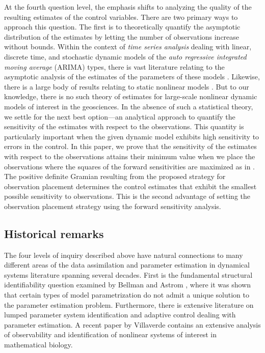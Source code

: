 \documentclass{article}
\begin{document}
At the fourth question level, the emphasis shifts to analyzing the quality of the resulting estimates of the control variables. There are two primary ways to approach this question. The first is to theoretically quantify the asymptotic distribution of the estimates by letting the number of observations increase without bounds. Within the context of \emph{time series analysis} dealing with linear, discrete time, and stochastic dynamic models of the \emph{auto regressive integrated moving average} (ARIMA) types, there is vast literature relating to the asymptotic analysis of the estimates of the parameters of these models \cite{fuller1976introduction, brockwell2006time}. Likewise, there is a large body of results relating to static nonlinear models \cite{seber1988nonlinear,gallant1987nonlinear}. But to our knowledge, there is no such theory of estimates for large-scale nonlinear dynamic models of interest in the geosciences. In the absence of such a statistical theory, we settle for the next best option---an analytical approach to quantify the sensitivity of the estimates with respect to the observations. This quantity is particularly important when the given dynamic model exhibits high sensitivity to errors in the control. In this paper, we prove that the sensitivity of the estimates with respect to the observations attains their minimum value when we place the observations where the squares of the forward sensitivities are maximized as in \cite{lakshmivarahan2020controlling,lakshmivarahan2022observability}. The positive definite Gramian resulting from the proposed strategy for observation placement determines the control estimates that exhibit the smallest possible sensitivity to observations. This is the second advantage of setting the observation placement strategy using the forward sensitivity analysis.

\subsection{Historical remarks}
The four levels of inquiry described above have natural connections to many different areas of the data assimilation and parameter estimation in dynamical systems literature spanning several decades. First is the fundamental structural identifiability question examined by Bellman and Astrom \cite{bellman1970structural}, where it was shown that certain types of model parametrization do not admit a unique solution to the parameter estimation problem. Furthermore, there is extensive literature on lumped parameter system identification \cite{ljung1999system} and adaptive control \cite{narendra1989stable} dealing with parameter estimation. A recent paper by Villaverde \cite{villaverde2019observability} contains an extensive analysis of observability and identification of nonlinear systems of interest in mathematical biology. 
\end{document}
